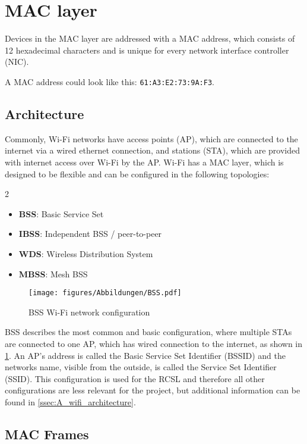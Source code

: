 \section{MAC layer}
Devices in the MAC layer are addressed with a MAC address, which consists of 12 hexadecimal characters and is unique for every network interface controller (NIC).

A MAC address could look like this: \lstinline[style=inline]|61:A3:E2:73:9A:F3|.

\subsection{Architecture}

Commonly, Wi-Fi networks have access points (AP), which are connected to the internet via a wired ethernet connection, and stations (STA), which are provided with internet access over Wi-Fi by the AP.
Wi-Fi has a MAC layer, which is designed to be flexible and can be configured in the following topologies:
\begin{multicols}{2}
\begin{itemize}
    \item \textbf{BSS}: Basic Service Set
    \item \textbf{IBSS}: Independent BSS / peer-to-peer 
    \item \textbf{WDS}: Wireless Distribution System
    \item \textbf{MBSS}: Mesh BSS
\end{itemize}
\end{multicols}

\begin{figure}[h]
    \centering
    \texttt{[image: figures/Abbildungen/BSS.pdf]}
    \caption{BSS Wi-Fi network configuration}
    \label{fig:BSS}
\end{figure}

BSS describes the most common and basic configuration, where multiple STAs are connected to one AP, which has wired connection to the internet, as shown in \cref{fig:BSS}.
An AP's address is called the Basic Service Set Identifier (BSSID) and the networks name, visible from the outside, is called the Service Set Identifier (SSID).
This configuration is used for the RCSL and therefore all other configurations are less relevant for the project, but additional information can be found in \cref{ssec:A_wifi_architecture}.

\subsection{MAC Frames}\label{ssec:wifi_basics_MAC_frames}

